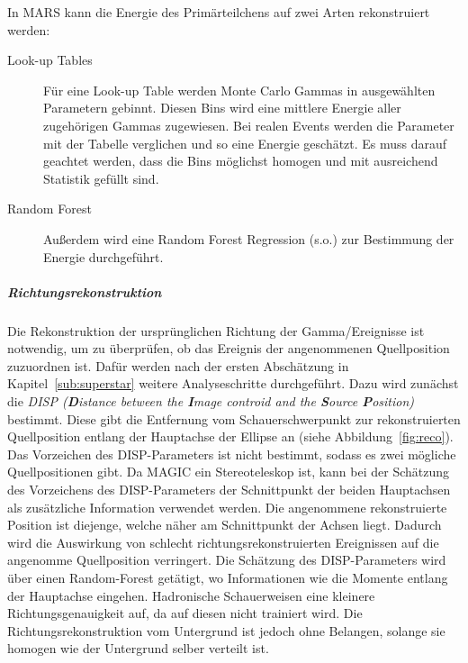 In MARS kann die Energie des Primärteilchens auf zwei Arten rekonstruiert werden:
\begin{description}
	\item[\quad Look-up Tables] Für eine Look-up Table werden Monte Carlo
		Gammas in ausgewählten Parametern gebinnt.
		Diesen Bins wird eine mittlere Energie aller
		zugehörigen Gammas zugewiesen.
		Bei realen Events werden die Parameter mit der Tabelle verglichen
		und so eine Energie geschätzt.
		Es muss darauf geachtet werden,
		dass die Bins möglichst homogen und mit ausreichend Statistik gefüllt sind.
	\item[\quad Random Forest] Außerdem wird eine Random Forest Regression (s.o.)
		zur Bestimmung der Energie durchgeführt.
\end{description}

\subparagraph{Richtungsrekonstruktion}%
\label{par:position}

Die Rekonstruktion der ursprünglichen Richtung der Gamma\-/Ereignisse
ist notwendig, um zu überprüfen, ob das Ereignis der angenommenen
Quellposition zuzuordnen ist.
Dafür werden nach der ersten Abschätzung in Kapitel~\ref{sub:superstar} weitere
Analyseschritte durchgeführt.
Dazu wird zunächst die \textit{DISP (\textbf{D}istance between the
\textbf{I}mage controid and the \textbf{S}ource \textbf{P}osition)} bestimmt.
Diese gibt die Entfernung vom Schauerschwerpunkt zur rekonstruierten Quellposition
entlang der Hauptachse der Ellipse an (siehe Abbildung~\ref{fig:reco}).
Das Vorzeichen des DISP-Parameters ist nicht bestimmt,
sodass es zwei mögliche Quellpositionen gibt.
Da MAGIC ein Stereoteleskop ist,
kann bei der Schätzung des Vorzeichens des DISP-Parameters
der Schnittpunkt der beiden Hauptachsen als zusätzliche Information
verwendet werden.
Die angenommene rekonstruierte Position ist diejenge, welche näher am
Schnittpunkt der Achsen liegt.
Dadurch wird die Auswirkung von schlecht richtungsrekonstruierten Ereignissen
auf die angenomme Quellposition verringert.
Die Schätzung des DISP-Parameters wird über einen Random-Forest getätigt,
wo Informationen wie die Momente entlang der Hauptachse eingehen.
Hadronische Schauerweisen eine kleinere Richtungsgenauigkeit auf, da auf diesen
nicht trainiert wird.
Die Richtungsrekonstruktion vom Untergrund ist jedoch ohne Belangen, solange sie
homogen wie der Untergrund selber verteilt ist.


